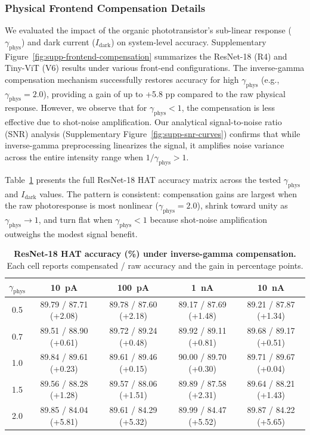 \subsubsection{Physical Frontend Compensation Details}

We evaluated the impact of the organic phototransistor's sub-linear response ($\gamma_{\mathrm{phys}}$) and dark current ($I_{\text{dark}}$) on system-level accuracy. Supplementary Figure~\ref{fig:supp-frontend-compensation} summarizes the ResNet-18 (R4) and Tiny-ViT (V6) results under various front-end configurations. The inverse-gamma compensation mechanism successfully restores accuracy for high $\gamma_{\mathrm{phys}}$ (e.g., $\gamma_{\mathrm{phys}}=2.0$), providing a gain of up to +5.8 pp compared to the raw physical response. However, we observe that for $\gamma_{\mathrm{phys}} < 1$, the compensation is less effective due to shot-noise amplification. Our analytical signal-to-noise ratio (SNR) analysis (Supplementary Figure~\ref{fig:supp-snr-curves}) confirms that while inverse-gamma preprocessing linearizes the signal, it amplifies noise variance across the entire intensity range when $1/\gamma_{\mathrm{phys}} > 1$.

Table~\ref{tab:supp-frontend-gamma-scan} presents the full ResNet-18 HAT accuracy matrix across the tested $\gamma_{\mathrm{phys}}$ and $I_{\text{dark}}$ values. The pattern is consistent: compensation gains are largest when the raw photoresponse is most nonlinear ($\gamma_{\mathrm{phys}}=2.0$), shrink toward unity as $\gamma_{\mathrm{phys}} \rightarrow 1$, and turn flat when $\gamma_{\mathrm{phys}} < 1$ because shot-noise amplification outweighs the modest signal benefit.

\begin{table}[ht]
    \centering
    \caption{\textbf{ResNet-18 HAT accuracy (\%) under inverse-gamma compensation.} Each cell reports compensated / raw accuracy and the gain in percentage points.}
    \label{tab:supp-frontend-gamma-scan}
    \small
    \setlength{\tabcolsep}{4pt}
    \begin{tabular}{c|cccc}
        \toprule
        $\gamma_{\mathrm{phys}}$ & 10~pA & 100~pA & 1~nA & 10~nA \\
        \midrule
        0.5 & 89.79 / 87.71 (+2.08) & 89.78 / 87.60 (+2.18) & 89.17 / 87.69 (+1.48) & 89.21 / 87.87 (+1.34) \\
        0.7 & 89.51 / 88.90 (+0.61) & 89.72 / 89.24 (+0.48) & 89.92 / 89.11 (+0.81) & 89.68 / 89.17 (+0.51) \\
        1.0 & 89.84 / 89.61 (+0.23) & 89.61 / 89.46 (+0.15) & 90.00 / 89.70 (+0.30) & 89.71 / 89.67 (+0.04) \\
        1.5 & 89.56 / 88.28 (+1.28) & 89.57 / 88.06 (+1.51) & 89.89 / 87.58 (+2.31) & 89.64 / 88.21 (+1.43) \\
        2.0 & 89.85 / 84.04 (+5.81) & 89.61 / 84.29 (+5.32) & 89.99 / 84.47 (+5.52) & 89.87 / 84.22 (+5.65) \\
        \bottomrule
    \end{tabular}
\end{table}

